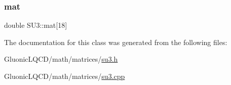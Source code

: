 \subsubsection{\texorpdfstring{mat}{mat}}
{\footnotesize\ttfamily double S\+U3\+::mat\mbox{[}18\mbox{]}}



The documentation for this class was generated from the following files\+:\begin{DoxyCompactItemize}
\item 
Gluonic\+L\+Q\+C\+D/math/matrices/\mbox{\hyperlink{su3_8h}{su3.\+h}}\item 
Gluonic\+L\+Q\+C\+D/math/matrices/\mbox{\hyperlink{su3_8cpp}{su3.\+cpp}}\end{DoxyCompactItemize}
